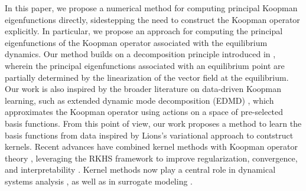 \documentclass[11pt]{article}
\theoremstyle{plain}
\begin{document}
In this paper, we propose a numerical method for computing principal Koopman eigenfunctions directly, sidestepping the need to construct the Koopman operator explicitly. In particular, we propose an approach for computing the principal eigenfunctions of the Koopman operator associated with the equilibrium dynamics. Our method builds on a decomposition principle introduced in \cite{deka2023path}, wherein the principal eigenfunctions associated with an equilibrium point are partially determined by the linearization of the vector field at the equilibrium. 
Our work is also inspired by the broader literature on data-driven Koopman learning, such as extended dynamic mode decomposition (EDMD) \cite{williamsEDMD}, which approximates the Koopman operator using actions on a space of pre-selected basis functions. From this point of view, our work proposes a method to learn the basis functions from data inspired by Lions's variational approach to contstruct kernels.  Recent advances have combined kernel methods with Koopman operator theory \cite{klus2020data,peherstorfer2020koopman,klus2015kernel,DAS2020573,hou2023sparse,ishikawa2024koopmanoperatorsintrinsicobservables}, leveraging the RKHS framework \cite{CuckerandSmale} to improve regularization, convergence, and interpretability \cite{chen2021solving,  houman_cgc}. Kernel methods now play a central role in dynamical systems analysis \cite{lee2025kernel, hamzi2018note, bouvrie2010balanced, bouvrie2012empirical, hamzi2019kernel,  yk1, bhcm11, bhcm1, lyap_bh, BHPhysicaD, hamzi2019kernel, bh2020b, klus2020data, ALEXANDER2020132520, bhks, bh12, bh17, hb17, mmd_kernels_bh, bh_kfs_p5,bh_kfs_p6,hou2024propagating,cole_hopf_poincare,kernel_sos}, as well as in surrogate modeling \cite{santinhaasdonk19}.

 
\end{document}
